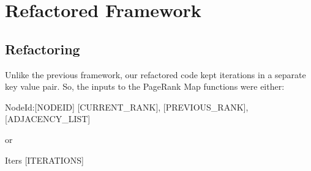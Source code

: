 \documentclass{article}
\begin{document}
\section{Refactored Framework}
\subsection*{Refactoring}
Unlike the previous framework, our refactored code kept iterations
in a separate key value pair. So, the inputs to the PageRank Map functions were either:
\begin{center}
  NodeId:[NODEID] \hspace{8mm} [CURRENT\_RANK], [PREVIOUS\_RANK], [ADJACENCY\_LIST]
\end{center}
or
\begin{center}
  Iters \hspace{8mm} [ITERATIONS]
\end{center}
\end{document}
